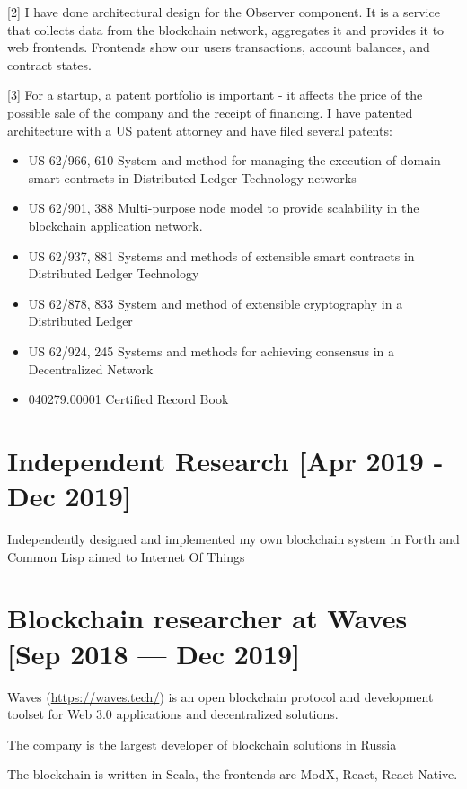 \documentclass[11pt]{article}
\begin{document}
[2] I have done architectural design for the Observer
component. It is a service that collects data from the
blockchain network, aggregates it and provides it to web
frontends. Frontends show our users transactions, account
balances, and contract states.

[3] For a startup, a patent portfolio is important - it
affects the price of the possible sale of the company and
the receipt of financing. I have patented architecture with
a US patent attorney and have filed several patents:
\begin{itemize}
\item US 62/966, 610 System and method for managing the
execution of domain smart contracts in Distributed
Ledger Technology networks
\item US 62/901, 388 Multi-purpose node model to provide
scalability in the blockchain application network.
\item US 62/937, 881 Systems and methods of extensible smart
contracts in Distributed Ledger Technology
\item US 62/878, 833 System and method of extensible
cryptography in a Distributed Ledger
\item US 62/924, 245 Systems and methods for achieving
consensus in a Decentralized Network
\item 040279.00001 Certified Record Book
\end{itemize}

\section{\textbf{Independent Research} [Apr 2019 - Dec 2019]}
\label{sec:org869c9d7}

Independently designed and implemented my own blockchain
system in Forth and Common Lisp aimed to Internet Of Things

\section{\textbf{Blockchain researcher} at \textbf{Waves} [Sep 2018 — Dec 2019]}
\label{sec:org630be52}

Waves (\url{https://waves.tech/}) is an open blockchain protocol
and development toolset for Web 3.0 applications and
decentralized solutions.

The company is the largest developer of blockchain solutions
in Russia

The blockchain is written in Scala, the frontends are ModX,
React, React Native.
\end{document}
